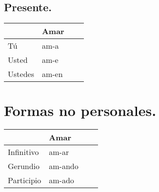 \documentclass[14pt]{extarticle}
\begin{document}
\subsection{Presente.}

\begin{table}[H]
\renewcommand{\arraystretch}{1.5}
\begin{tabular}{| l | l |  p{3cm}  | p{3cm} |} \hline
 & Amar & & \\ \hline
Tú & am-a & & \\
Usted & am-e & & \\
Ustedes & am-en & & \\ \hline
\end{tabular}
\end{table}

\section{Formas no personales.}

\begin{table}[H]
\renewcommand{\arraystretch}{1.5}
\begin{tabular}{| l | l |  p{3cm}  | p{3cm} |} \hline
    & Amar & & \\ \hline
Infinitivo & am-ar & & \\
Gerundio & am-ando & & \\
Participio & am-ado & & \\ \hline
\end{tabular}
\end{table}
\end{document}
